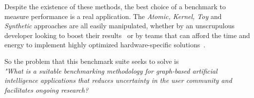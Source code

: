 Despite the existence of these methods, the best choice of a benchmark to measure performance is a real application.
The \textit{Atomic, Kernel, Toy} and \textit{Synthetic} approaches are all easily manipulated, whether by an unscrupulous developer looking to boost their results~\cite{Hennessy2019} or by teams that can afford the time and energy to implement highly optimized hardware-specific solutions~\cite{Hooker1995}.

So the problem that this benchmark suite seeks to solve is \\ \textit{"What is a suitable benchmarking methodology for graph-based artificial intelligence applications that reduces uncertainty in the user community and facilitates ongoing research?}

%
%